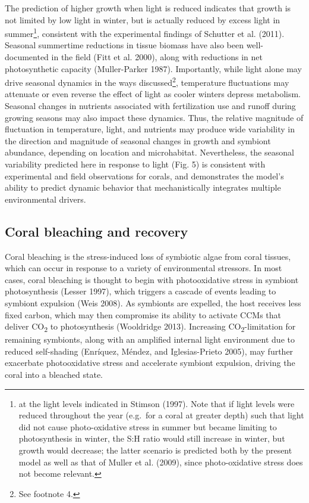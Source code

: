 \documentclass[]{elsarticle} %
\begin{document}
The prediction of higher growth when light is reduced indicates that
growth is not limited by low light in winter, but is actually reduced by
excess light in summer\footnote{at the light levels indicated in Stimson
  (1997). Note that if light levels were reduced throughout the year
  (e.g.~for a coral at greater depth) such that light did not cause
  photo-oxidative stress in summer but became limiting to photosynthesis
  in winter, the S:H ratio would still increase in winter, but growth
  would decrease; the latter scenario is predicted both by the present
  model as well as that of Muller et al. (2009), since photo-oxidative
  stress does not become relevant.}, consistent with the experimental
findings of Schutter et al. (2011). Seasonal summertime reductions in
tissue biomass have also been well-documented in the field (Fitt et al.
2000), along with reductions in net photosynthetic capacity
(Muller-Parker 1987). Importantly, while light alone may drive seasonal
dynamics in the ways discussed\footnote{See footnote 4.}, temperature
fluctuations may attenuate or even reverse the effect of light as cooler
winters depress metabolism. Seasonal changes in nutrients associated
with fertilization use and runoff during growing seasons may also impact
these dynamics. Thus, the relative magnitude of fluctuation in
temperature, light, and nutrients may produce wide variability in the
direction and magnitude of seasonal changes in growth and symbiont
abundance, depending on location and microhabitat. Nevertheless, the
seasonal variability predicted here in response to light (Fig. 5) is
consistent with experimental and field observations for corals, and
demonstrates the model's ability to predict dynamic behavior that
mechanistically integrates multiple environmental drivers.

\subsection{Coral bleaching and
recovery}\label{coral-bleaching-and-recovery}

Coral bleaching is the stress-induced loss of symbiotic algae from coral
tissues, which can occur in response to a variety of environmental
stressors. In most cases, coral bleaching is thought to begin with
photooxidative stress in symbiont photosynthesis (Lesser 1997), which
triggers a cascade of events leading to symbiont expulsion (Weis 2008).
As symbionts are expelled, the host receives less fixed carbon, which
may then compromise its ability to activate CCMs that deliver
CO\textsubscript{2} to photosynthesis (Wooldridge 2013). Increasing
CO\textsubscript{2}-limitation for remaining symbionts, along with an
amplified internal light environment due to reduced self-shading
(Enríquez, Méndez, and Iglesias-Prieto 2005), may further exacerbate
photooxidative stress and accelerate symbiont expulsion, driving the
coral into a bleached state.
\end{document}
